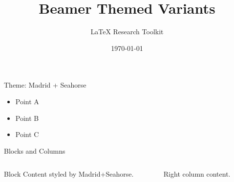 \documentclass[aspectratio=169]{beamer}
\title{Beamer Themed Variants}
\author{LaTeX Research Toolkit}
\date{\today}
\begin{document}
\begin{frame}
  \titlepage
\end{frame}

\begin{frame}{Theme: Madrid + Seahorse}
\begin{itemize}
  \item Point A
  \item Point B
  \item Point C
\end{itemize}
\end{frame}

\begin{frame}{Blocks and Columns}
\begin{columns}
\begin{column}{0.48\textwidth}
\begin{block}{Block}
Content styled by Madrid+Seahorse.
\end{block}
\end{column}
\begin{column}{0.48\textwidth}
Right column content.
\end{column}
\end{columns}
\end{frame}

\end{document}

